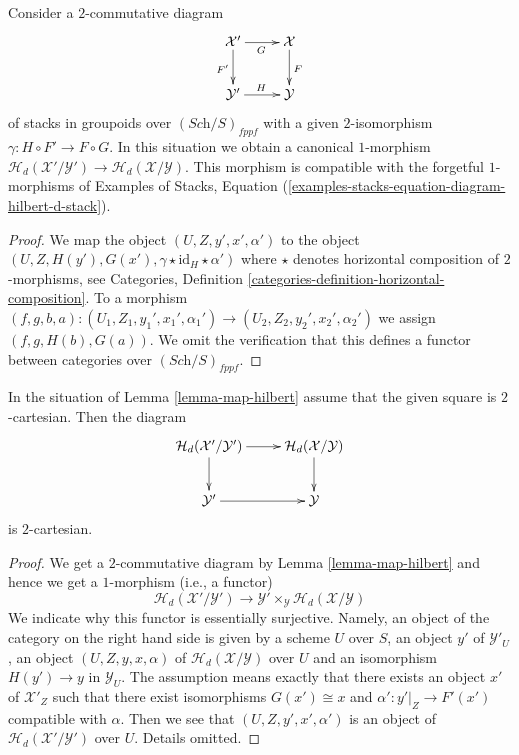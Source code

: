 \begin{lemma}
\label{lemma-map-hilbert}
Consider a $2$-commutative diagram
$$
\xymatrix{
\mathcal{X}' \ar[r]_G \ar[d]_{F'} & \mathcal{X} \ar[d]^F \\
\mathcal{Y}' \ar[r]^H & \mathcal{Y}
}
$$
of stacks in groupoids over $(\textit{Sch}/S)_{fppf}$ with a given
$2$-isomorphism $\gamma : H \circ F' \to F \circ G$. In this situation we
obtain a canonical $1$-morphism
$\mathcal{H}_d(\mathcal{X}'/\mathcal{Y}') \to
\mathcal{H}_d(\mathcal{X}/\mathcal{Y})$.
This morphism is compatible with the forgetful $1$-morphisms of
Examples of Stacks,
Equation (\ref{examples-stacks-equation-diagram-hilbert-d-stack}).
\end{lemma}

\begin{proof}
We map the object $(U, Z, y', x', \alpha')$ to the object
$(U, Z, H(y'), G(x'), \gamma \star \text{id}_H \star \alpha')$
where $\star$ denotes horizontal composition of $2$-morphisms, see
Categories, Definition \ref{categories-definition-horizontal-composition}.
To a morphism
$(f, g, b, a) :
(U_1, Z_1, y_1', x_1', \alpha_1') \to (U_2, Z_2, y_2', x_2', \alpha_2')$
we assign
$(f, g, H(b), G(a))$.
We omit the verification that this defines a functor between categories over
$(\textit{Sch}/S)_{fppf}$.
\end{proof}

\begin{lemma}
\label{lemma-cartesian-map-hilbert}
In the situation of
Lemma \ref{lemma-map-hilbert}
assume that the given square is $2$-cartesian. Then the diagram
$$
\xymatrix{
\mathcal{H}_d(\mathcal{X}'/\mathcal{Y}') \ar[r] \ar[d] &
\mathcal{H}_d(\mathcal{X}/\mathcal{Y}) \ar[d] \\
\mathcal{Y}' \ar[r] &
\mathcal{Y}
}
$$
is $2$-cartesian.
\end{lemma}

\begin{proof}
We get a $2$-commutative diagram by
Lemma \ref{lemma-map-hilbert}
and hence we get a $1$-morphism (i.e., a functor)
$$
\mathcal{H}_d(\mathcal{X}'/\mathcal{Y}')
\longrightarrow
\mathcal{Y}' \times_{\mathcal{Y}} \mathcal{H}_d(\mathcal{X}/\mathcal{Y})
$$
We indicate why this functor is essentially surjective. Namely, an object
of the category on the right hand side is given by a scheme $U$ over $S$,
an object $y'$ of $\mathcal{Y}'_U$, an object $(U, Z, y, x, \alpha)$
of $\mathcal{H}_d(\mathcal{X}/\mathcal{Y})$ over $U$ and an isomorphism
$H(y') \to y$ in $\mathcal{Y}_U$. The assumption means exactly that
there exists an object $x'$ of $\mathcal{X}'_Z$ such that there exist
isomorphisms $G(x') \cong x$ and $\alpha' : y'|_Z \to F'(x')$ compatible
with $\alpha$. Then we see that $(U, Z, y', x', \alpha')$ is an
object of $\mathcal{H}_d(\mathcal{X}'/\mathcal{Y}')$ over $U$.
Details omitted.
\end{proof}

